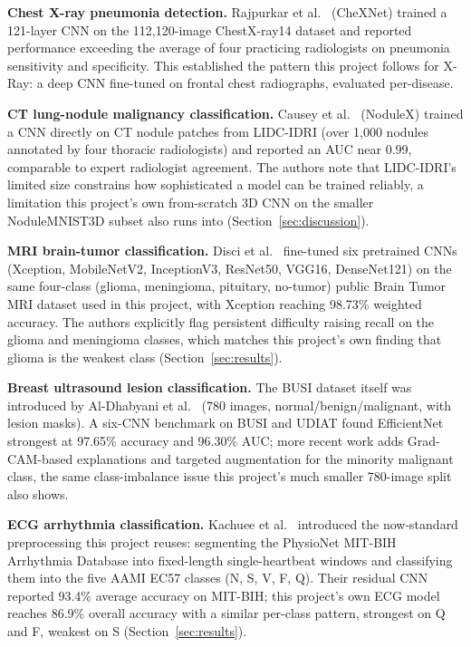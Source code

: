 \documentclass[conference]{IEEEtran}
\begin{document}
\textbf{Chest X-ray pneumonia detection.} Rajpurkar et al.~\cite{chexnet} (CheXNet) trained a 121-layer CNN on the 112{,}120-image ChestX-ray14 dataset and reported performance exceeding the average of four practicing radiologists on pneumonia sensitivity and specificity. This established the pattern this project follows for X-Ray: a deep CNN fine-tuned on frontal chest radiographs, evaluated per-disease.

\textbf{CT lung-nodule malignancy classification.} Causey et al.~\cite{nodulex} (NoduleX) trained a CNN directly on CT nodule patches from LIDC-IDRI (over 1{,}000 nodules annotated by four thoracic radiologists) and reported an AUC near 0.99, comparable to expert radiologist agreement. The authors note that LIDC-IDRI's limited size constrains how sophisticated a model can be trained reliably, a limitation this project's own from-scratch 3D CNN on the smaller NoduleMNIST3D subset also runs into (Section~\ref{sec:discussion}).

\textbf{MRI brain-tumor classification.} Disci et al.~\cite{mri_cancers} fine-tuned six pretrained CNNs (Xception, MobileNetV2, InceptionV3, ResNet50, VGG16, DenseNet121) on the same four-class (glioma, meningioma, pituitary, no-tumor) public Brain Tumor MRI dataset used in this project, with Xception reaching 98.73\% weighted accuracy. The authors explicitly flag persistent difficulty raising recall on the glioma and meningioma classes, which matches this project's own finding that glioma is the weakest class (Section~\ref{sec:results}).

\textbf{Breast ultrasound lesion classification.} The BUSI dataset itself was introduced by Al-Dhabyani et al.~\cite{busi} (780 images, normal/benign/malignant, with lesion masks). A six-CNN benchmark on BUSI and UDIAT found EfficientNet strongest at 97.65\% accuracy and 96.30\% AUC; more recent work adds Grad-CAM-based explanations and targeted augmentation for the minority malignant class, the same class-imbalance issue this project's much smaller 780-image split also shows.

\textbf{ECG arrhythmia classification.} Kachuee et al.~\cite{kachuee} introduced the now-standard preprocessing this project reuses: segmenting the PhysioNet MIT-BIH Arrhythmia Database into fixed-length single-heartbeat windows and classifying them into the five AAMI EC57 classes (N, S, V, F, Q). Their residual CNN reported 93.4\% average accuracy on MIT-BIH; this project's own ECG model reaches 86.9\% overall accuracy with a similar per-class pattern, strongest on Q and F, weakest on S (Section~\ref{sec:results}).
\end{document}
